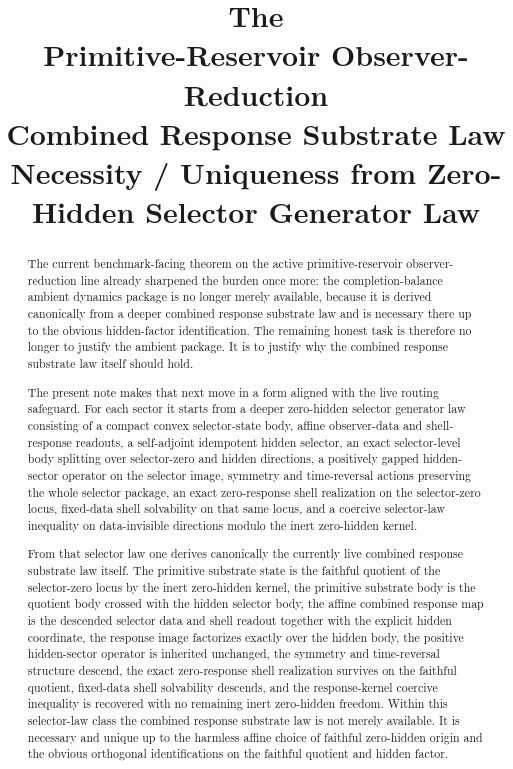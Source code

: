 \documentclass[11pt]{article}
\title{\textbf{The \TheoryName{}}\\[0.4em]
\large Primitive-Reservoir Observer-Reduction\\
\large Combined Response Substrate Law\\
\large Necessity / Uniqueness from Zero-Hidden Selector Generator Law}
\author{}
\date{}
\begin{document}
\maketitle

\begin{abstract}
The current benchmark-facing theorem on the active primitive-reservoir observer-reduction line already sharpened the burden once more: the completion-balance ambient dynamics package is no longer merely available, because it is derived canonically from a deeper combined response substrate law and is necessary there up to the obvious hidden-factor identification. The remaining honest task is therefore no longer to justify the ambient package. It is to justify why the combined response substrate law itself should hold.

The present note makes that next move in a form aligned with the live routing safeguard. For each sector it starts from a deeper zero-hidden selector generator law consisting of a compact convex selector-state body, affine observer-data and shell-response readouts, a self-adjoint idempotent hidden selector, an exact selector-level body splitting over selector-zero and hidden directions, a positively gapped hidden-sector operator on the selector image, symmetry and time-reversal actions preserving the whole selector package, an exact zero-response shell realization on the selector-zero locus, fixed-data shell solvability on that same locus, and a coercive selector-law inequality on data-invisible directions modulo the inert zero-hidden kernel.

From that selector law one derives canonically the currently live combined response substrate law itself. The primitive substrate state is the faithful quotient of the selector-zero locus by the inert zero-hidden kernel, the primitive substrate body is the quotient body crossed with the hidden selector body, the affine combined response map is the descended selector data and shell readout together with the explicit hidden coordinate, the response image factorizes exactly over the hidden body, the positive hidden-sector operator is inherited unchanged, the symmetry and time-reversal structure descend, the exact zero-response shell realization survives on the faithful quotient, fixed-data shell solvability descends, and the response-kernel coercive inequality is recovered with no remaining inert zero-hidden freedom. Within this selector-law class the combined response substrate law is not merely available. It is necessary and unique up to the harmless affine choice of faithful zero-hidden origin and the obvious orthogonal identifications on the faithful quotient and hidden factor.


\end{abstract}
\end{document}
